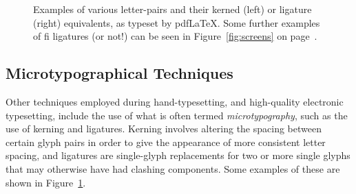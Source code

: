 \begin{figure}
 \caption[Examples of microtypographical techniques]{Examples of various letter-pairs and their kerned (left) or ligature (right) equivalents, as typeset by pdf\LaTeX{}. Some further examples of fi ligatures (or not!) can be seen in Figure~\ref{fig:screens} on page~\pageref{fig:screens}.}
 \label{fig:kern-lig}
\end{figure}


\subsection{Microtypographical Techniques}
\label{sec:microtypography}
Other techniques employed during hand-type\-set\-t\-ing, and high-qua\-l\-ity electronic typesetting, include the use of what is often termed \emph{micro\-typo\-graphy},\hspace{0pt}\cite{Hurst2009} such as the use of \gls{kerning} and ligatures. Kerning involves altering the spacing between certain \gls{glyph} pairs in order to give the appearance of more consistent letter spacing, and ligatures are sin\-gle-\gls{glyph} replacements for two or more single \glspl{glyph} that may otherwise have had clashing components. Some examples of these are shown in Figure~\ref{fig:kern-lig}.

